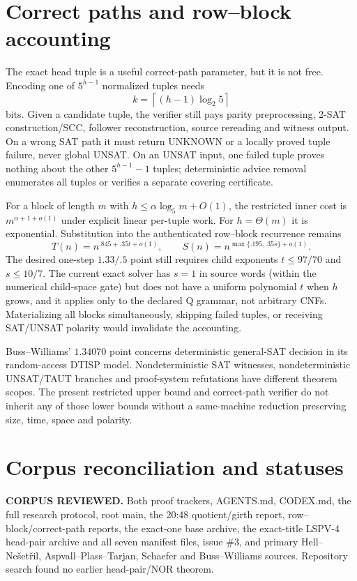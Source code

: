 \documentclass[11pt]{article}
\begin{document}
\section{Correct paths and row--block accounting}
The exact head tuple is a useful correct-path parameter, but it is not free.  Encoding one of $5^{h-1}$ normalized tuples needs
\[
k=\left\lceil(h-1)\log_2 5\right\rceil
\]
bits.  Given a candidate tuple, the verifier still pays parity preprocessing, 2-SAT construction/SCC, follower reconstruction, source rereading and witness output.  On a wrong SAT path it must return UNKNOWN or a locally proved tuple failure, never global UNSAT.  On an UNSAT input, one failed tuple proves nothing about the other $5^{h-1}-1$ tuples; deterministic advice removal enumerates all tuples or verifies a separate covering certificate.

For a block of length $m$ with $h\le\alpha\log_5m+O(1)$, the restricted inner cost is $m^{\alpha+1+o(1)}$ under explicit linear per-tuple work.  For $h=\Theta(m)$ it is exponential.  Substitution into the authenticated row--block recurrence remains
\[
T(n)=n^{.845+.35t+o(1)},\qquad S(n)=n^{\max\{.195,.35s\}+o(1)}.
\]
The desired one-step $1.33/.5$ point still requires child exponents $t\le97/70$ and $s\le10/7$.  The current exact solver has $s=1$ in source words (within the numerical child-space gate) but does not have a uniform polynomial $t$ when $h$ grows, and it applies only to the declared Q grammar, not arbitrary CNFs.  Materializing all blocks simultaneously, skipping failed tuples, or receiving SAT/UNSAT polarity would invalidate the accounting.

Buss--Williams' $1.34070$ point concerns deterministic general-SAT decision in its random-access DTISP model.  Nondeterministic SAT witnesses, nondeterministic UNSAT/TAUT branches and proof-system refutations have different theorem scopes.  The present restricted upper bound and correct-path verifier do not inherit any of those lower bounds without a same-machine reduction preserving size, time, space and polarity.

\section{Corpus reconciliation and statuses}
\textbf{CORPUS REVIEWED.}  Both proof trackers, AGENTS.md, CODEX.md, the full research protocol, root main, the 20:48 quotient/girth report, row--block/correct-path reports, the exact-one base archive, the exact-title LSPV-4 head-pair archive and all seven manifest files, issue \#3, and primary Hell--Ne\v{s}et\v{r}il, Aspvall--Plass--Tarjan, Schaefer and Buss--Williams sources.  Repository search found no earlier head-pair/NOR theorem.
\end{document}

